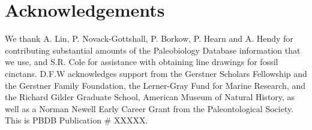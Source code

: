 \documentclass{article}
\begin{document}
\section{Acknowledgements}
We thank A. Lin, P. Novack-Gottshall, P. Borkow, P. Hearn and A. Hendy for contributing substantial amounts of the Paleobiology Database information that we use, and S.R. Cole for assistance with obtaining line drawings for fossil cinctans. D.F.W acknowledges support from the Gerstner Scholars Fellowship and the Gerstner Family Foundation, the Lerner-Gray Fund for Marine Research, and the Richard Gilder Graduate School, American Museum of Natural History, as well as a Norman Newell Early Career Grant from the Paleontological Society. This is PBDB Publication # XXXXX.


 

\end{document}
